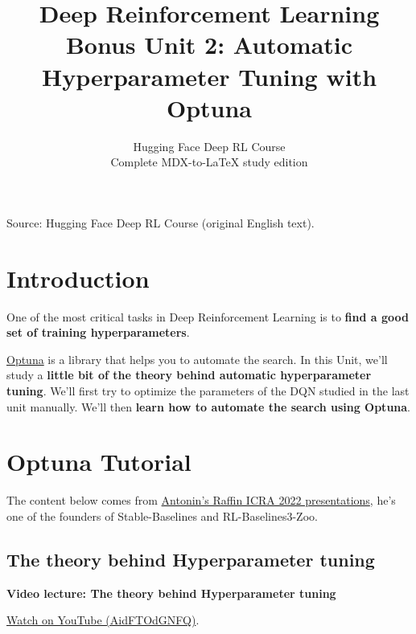 \documentclass[11pt,a4paper]{article}
\title{\textbf{Deep Reinforcement Learning}\\[0.35em]\large Bonus Unit 2: Automatic Hyperparameter Tuning with Optuna}
\author{Hugging Face Deep RL Course\\\small Complete MDX-to-\LaTeX{} study edition}
\date{}
\begin{document}
\maketitle
\vspace{-1em}
\begin{center}\small\color{secondary}Source: Hugging Face Deep RL Course (original English text).\end{center}
\vspace{-0.45em}
\begingroup\small\setlength{\parskip}{0pt}\tableofcontents\endgroup
\vspace{0.3em}

\section{Introduction}\label{introduction}

One of the most critical tasks in Deep Reinforcement Learning is to \textbf{find a good set of training hyperparameters}.


\href{https://optuna.org/}{Optuna} is a library that helps you to automate the search. In this Unit, we'll study a \textbf{little bit of the theory behind automatic hyperparameter tuning}. We'll first try to optimize the parameters of the DQN studied in the last unit manually. We'll then \textbf{learn how to automate the search using Optuna}.

\section{Optuna Tutorial}\label{optuna}

The content below comes from \href{https://araffin.github.io/tools-for-robotic-rl-icra2022/}{Antonin's Raffin ICRA 2022 presentations}, he's one of the founders of Stable-Baselines and RL-Baselines3-Zoo.

\subsection{The theory behind Hyperparameter tuning}

\begin{coursenote}
  \textbf{Video lecture: The theory behind Hyperparameter tuning}\par
  \href{https://www.youtube.com/watch?v=AidFTOdGNFQ}{Watch on YouTube (AidFTOdGNFQ)}.
\end{coursenote}
\end{document}
